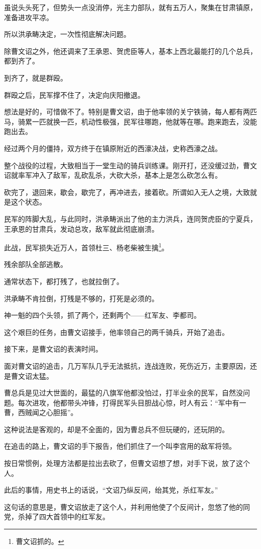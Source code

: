 \begin{multicols}{\theparacolNo}
虽说头头死了，但势头一点没消停，光主力部队，就有五万人，聚集在甘肃镇原，准备进攻平凉。

所以洪承畴决定，一次性彻底解决问题。

除曹文诏之外，他还调来了王承恩、贺虎臣等人，基本上西北最能打的几个总兵，都到齐了。

到齐了，就是群殴。

群殴之后，民军撑不住了，决定向庆阳撤退。

想法是好的，可惜做不了。特别是曹文诏，由于他率领的关宁铁骑，每人都有两匹马，骑累一匹就换一匹，机动性极强，民军往哪跑，他就等在哪。跑来跑去，没能跑出去。

经过两个月的僵持，双方终于在镇原附近的西濠决战，史称西濠之战。

整个战役的过程，大致相当于一堂生动的骑兵训练课。刚开打，还没缓过劲，曹文诏就率军冲入了敌军，乱砍乱杀，大砍大杀，基本上是怎么砍怎么有。

砍完了，退回来，歇会，歇完了，再冲进去，接着砍。所谓如入无人之境，大致就是这个状态。

民军的阵脚大乱，与此同时，洪承畴派出了他的主力洪兵，连同贺虎臣的宁夏兵，王承恩的甘肃兵，发动总攻，敌军就此彻底崩溃。

此战，民军损失近万人，首领杜三、杨老柴被生擒\footnote{曹文诏抓的。}。

残余部队全部逃散。

通常状态下，都打残了，也就拉倒了。

洪承畴不肯拉倒，打残是不够的，打死是必须的。

神一魁的四个头领，抓了两个，还剩两个——红军友、李都司。

这个艰巨的任务，由曹文诏接手，他率领自己的两千骑兵，开始了追击。

接下来，是曹文诏的表演时间。

面对曹文诏的追击，几万军队几乎无法抵抗，连战连败，死伤近万，主要原因，还是曹文诏太猛。

曹总兵是见过大世面的，最猛的八旗军他都没怕过，打半业余的民军，自然没问题。每次进攻，他都带头冲锋，打得民军头目胆战心惊，时人有云：“军中有一曹，西贼闻之心胆摇”。

这种说法是客观的，却是不全面的，因为曹总兵不但玩硬的，还玩阴的。

在追击的路上，曹文诏的手下报告，他们抓住了一个叫李宫用的敌军将领。

按日常惯例，处理方法都是拉出去砍了，但曹文诏想了想，对手下说，放了这个人。

此后的事情，用史书上的话说，“文诏乃纵反间，绐其党，杀红军友。”

这句话的意思是，曹文诏放走了这个人，并利用他使了个反间计，忽悠了他的同党，杀掉了四大首领中的红军友。


\end{multicols}
